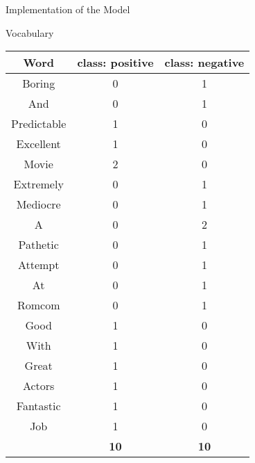 \documentclass[usenames,dvipsnames]{beamer}
\begin{document}
\begin{frame}{Implementation of the Model}
	\begin{block}{Vocabulary}
	\begin{table}[]
		\begin{tabular}{|c|c|c|}
			\hline
			\multicolumn{1}{|c|}{\textbf{Word}} & \textbf{class: positive} & \textbf{class: negative} \\ \hline
		Boring        & 0               & 1               \\ \hline
			And               & 0               & 1               \\ \hline
			Predictable       & 1               & 0               \\ \hline
			Excellent        & 1               & 0               \\ \hline
			Movie           & 2               & 0               \\ \hline
			Extremely       & 0               & 1               \\ \hline
			Mediocre          & 0               & 1               \\ \hline
			A                 & 0               & 2               \\ \hline
			Pathetic           & 0               & 1               \\ \hline
			Attempt            & 0               & 1               \\ \hline
			At                  & 0               & 1               \\ \hline
			Romcom             & 0               & 1               \\ \hline
			Good              & 1               & 0               \\ \hline
			With          & 1               & 0               \\ \hline
			Great            & 1               & 0               \\ \hline
			Actors           & 1               & 0               \\ \hline
			Fantastic        & 1               & 0               \\ \hline
			Job              & 1               & 0               \\ \hline
			& \textbf{10}              & \textbf{10}              \\ \hline
		\end{tabular}
	\end{table}
\end{block}
\end{frame}
\end{document}
